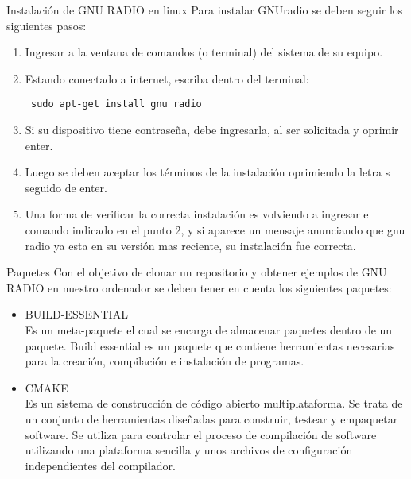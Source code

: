 \begin{frame}{Instalaci\'on de GNU RADIO en linux}
{Para instalar GNUradio se deben seguir los siguientes pasos:}
\begin{enumerate}[1.]
\item Ingresar a la ventana de comandos (o terminal) del sistema de su equipo.
\item Estando conectado a internet, escriba dentro del terminal:

  \begin{block}{}
  \texttt{
    sudo apt-get install gnu radio}
  \end{block}

\item Si su dispositivo tiene contrase\~na, debe ingresarla, al ser solicitada y oprimir enter. 
\item Luego se deben aceptar los t\'erminos de la instalaci\'on oprimiendo la letra s seguido de enter. 
\item Una forma de verificar la correcta instalaci\'on es volviendo a ingresar el comando indicado en el punto 2, y si aparece un mensaje anunciando que gnu radio ya esta en su versi\'on mas reciente, su instalaci\'on fue correcta.
\end{enumerate}
\end{frame}


\begin{frame}{Paquetes}
Con el objetivo de clonar un repositorio y obtener ejemplos de GNU RADIO en nuestro ordenador se deben tener en cuenta los siguientes paquetes: 
  \begin{itemize}
  \item {BUILD-ESSENTIAL\\}
  {Es un meta-paquete el cual se encarga de almacenar paquetes dentro de un paquete. Build essential es un paquete que contiene herramientas necesarias para la creaci\'on, compilaci\'on e instalaci\'on de programas.}
  \item {CMAKE\\}
  {Es un sistema de construcci\'on de c\'odigo abierto multiplataforma. Se trata de un conjunto de herramientas dise\~nadas para construir, testear y empaquetar software. Se utiliza para controlar el proceso de compilaci\'on de software utilizando una plataforma sencilla y unos archivos de configuraci\'on independientes del compilador.}
  \end{itemize}
\end{frame}


